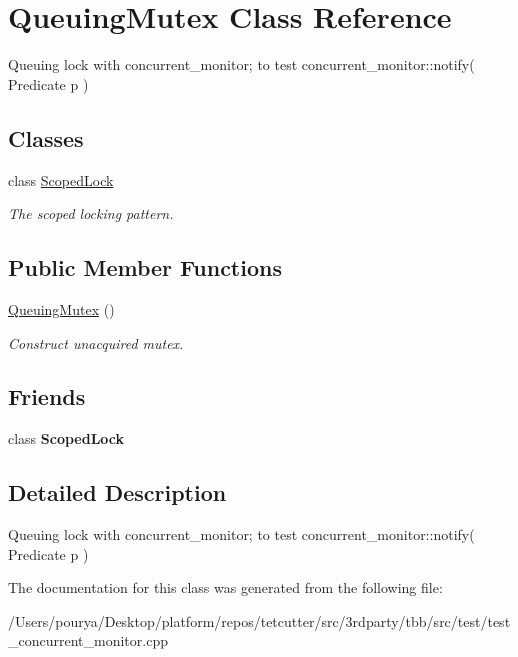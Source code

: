 \hypertarget{classQueuingMutex}{}\section{Queuing\+Mutex Class Reference}
\label{classQueuingMutex}


Queuing lock with concurrent\+\_\+monitor; to test concurrent\+\_\+monitor\+::notify( Predicate p )  


\subsection*{Classes}
\begin{DoxyCompactItemize}
\item 
class \hyperlink{classQueuingMutex_1_1ScopedLock}{Scoped\+Lock}
\begin{DoxyCompactList}\small\item\em The scoped locking pattern. \end{DoxyCompactList}\end{DoxyCompactItemize}
\subsection*{Public Member Functions}
\begin{DoxyCompactItemize}
\item 
\hypertarget{classQueuingMutex_a5b355ade858b52e40c7e4e395675925e}{}\hyperlink{classQueuingMutex_a5b355ade858b52e40c7e4e395675925e}{Queuing\+Mutex} ()\label{classQueuingMutex_a5b355ade858b52e40c7e4e395675925e}

\begin{DoxyCompactList}\small\item\em Construct unacquired mutex. \end{DoxyCompactList}\end{DoxyCompactItemize}
\subsection*{Friends}
\begin{DoxyCompactItemize}
\item 
\hypertarget{classQueuingMutex_a5058cdfb7df310bafdc226830d5acd0f}{}class {\bfseries Scoped\+Lock}\label{classQueuingMutex_a5058cdfb7df310bafdc226830d5acd0f}

\end{DoxyCompactItemize}


\subsection{Detailed Description}
Queuing lock with concurrent\+\_\+monitor; to test concurrent\+\_\+monitor\+::notify( Predicate p ) 

The documentation for this class was generated from the following file\+:\begin{DoxyCompactItemize}
\item 
/\+Users/pourya/\+Desktop/platform/repos/tetcutter/src/3rdparty/tbb/src/test/test\+\_\+concurrent\+\_\+monitor.\+cpp\end{DoxyCompactItemize}
